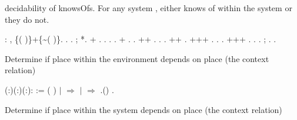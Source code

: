 \documentclass[12pt]{report}
\begin{document}
decidability of knowsOfs. For any system , either  knows 
   of  within the system or they do not. 
\begin{coqdoccode}
\coqdocemptyline
\coqdocnoindent
{} :\coqdockw{\ensuremath{\forall}}   , \{(   )\}+\{\~{}(   )\}.\coqdoceol
\coqdocnoindent
{}.\coqdoceol
\coqdocindent{2.00em}
   .\coqdoceol
\coqdocindent{2.00em}
 ;   *.\coqdoceol
\coqdocindent{2.00em}
+ .  . .  .\coqdoceol
\coqdocindent{2.00em}
+      .  .\coqdoceol
\coqdocindent{2.00em}
++ . .  .\coqdoceol
\coqdocindent{2.00em}
++  .\coqdoceol
\coqdocindent{2.00em}
+++ . .  .\coqdoceol
\coqdocindent{2.00em}
+++ .  . .  ; .\coqdoceol
\coqdocnoindent
{}.\coqdoceol
\coqdocemptyline
\end{coqdoccode}
Determine if place  within the environment   
    depends on place  (the context relation) 
\begin{coqdoccode}
\coqdocnoindent
{}  (:)(:)(:): :=\coqdoceol
\coqdocnoindent
{} ( ) \coqdoceol
\coqdocnoindent
\ensuremath{|}  \ensuremath{\Rightarrow} \coqdoceol
\coqdocnoindent
\ensuremath{|}   \ensuremath{\Rightarrow}   .()\coqdoceol
\coqdocnoindent
{}.\coqdoceol
\coqdocemptyline
\end{coqdoccode}
Determine if place  within the system  depends on place  (the context relation) 
\end{document}
